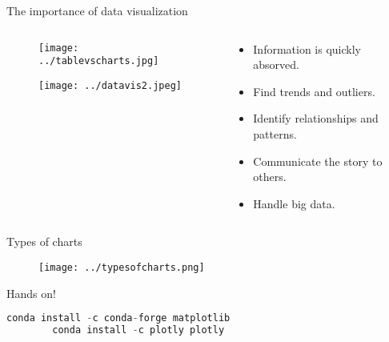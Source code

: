 \documentclass{beamer}
\begin{document}
\begin{frame}{The importance of data visualization}
 
\begin{columns}

\begin{column}[t]{0.55\textwidth}


  \begin{figure}
  \texttt{[image: ../tablevscharts.jpg]}
  \end{figure}
  \begin{figure}
  \texttt{[image: ../datavis2.jpeg]}
  \end{figure}

\end{column}

\begin{column}[t]{0.4\textwidth}

    \begin{itemize}[<+(1)->]

    \item Information is quickly absorved.
    \item Find trends and outliers.
    \item Identify relationships and patterns.
    \item Communicate the story to others.
    \item Handle big data.


    \end{itemize}

\end{column}

\end{columns}
  
\end{frame}


\begin{frame}{Types of charts}

  \begin{figure}
  \texttt{[image: ../typesofcharts.png]}
  \end{figure}
  
\end{frame}


\begin{frame}[fragile]{Hands on!}

        \begin{lstlisting}[language= Python, frame = single, title={Packages to install}]
        conda install -c conda-forge matplotlib 
        conda install -c plotly plotly 
        \end{lstlisting}
        
\end{frame}
\end{document}
